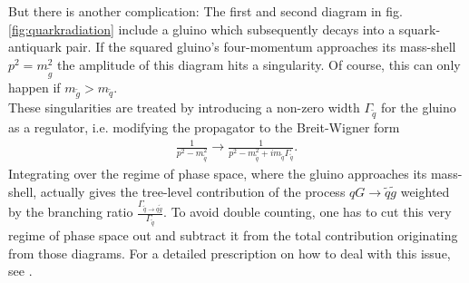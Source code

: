 But there is another complication: The first and second diagram in fig. \ref{fig:quarkradiation} include a gluino which subsequently decays into a squark-antiquark pair. If the squared gluino's four-momentum approaches its mass-shell $p^2 = m^2_{\tilde{g}}$ the amplitude of this diagram hits a singularity. Of course, this can only happen if $m_{\tilde{g}} > m_{\tilde{q}}$.\\
These singularities are treated by introducing a non-zero width $\Gamma_{\tilde{q}}$ for the gluino as a regulator, i.e. modifying the propagator to the Breit-Wigner form
\begin{align}
\frac{1}{p^2 - m_{\tilde{q}}^2} \to \frac{1}{p^2 - m_{\tilde{q}}^2 + i m_{\tilde{q}} \Gamma_{\tilde{q}}}.
\end{align}
Integrating over the regime of phase space, where the gluino approaches its mass-shell, actually gives the tree-level contribution of the process $qG \to \tilde{q}\tilde{g}$ weighted by the branching ratio $\frac{\Gamma_{\tilde{q}\to q \tilde{g}}}{\Gamma_{\tilde{q}}}$. To avoid double counting, one has to cut this very regime of phase space out and subtract it from the total contribution originating from those diagrams. For a detailed prescription on how to deal with this issue, see \cite{Beenakker:1996ch, Gavin:2013kga}.



\newpage
